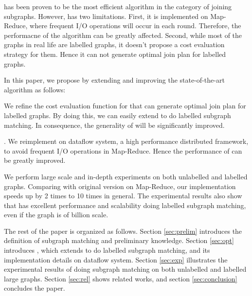  \cliquejoin has been proven to be the most efficient algorithm in the category of joining subgraphs\cite{Lai2016}. However, \cliquejoin has two limitations. First, it is implemented on Map-Reduce, where frequent I/O operations will occur in each round. Therefore, the performacne of the algorithm can be greatly affected. Second, while most of the graphs in real life are labelled graphs, it doesn't propose a cost evaluation strategy for them. Hence it can not generate optimal join plan for labelled graphs.

 In this paper, we propose \gencliqjoin by extending and improving the state-of-the-art algorithm \cliquejoin as follows:

 We refine the cost evaluation function for \cliquejoin that can generate optimal join plan for labelled graphs. By doing this, we can easily extend \cliquejoin to do labelled subgraph matching. In consequence, the generality of \cliquejoin will be significantly improved.

\cite{Murray2013}. We reimplement \cliquejoin on \timely dataflow system, a high performance distributed framework, to avoid frequent I/O operations in Map-Reduce. Hence the performance of \cliquejoin can be greatly improved.

 We perform large scale and in-depth experiments on both unlabelled and labelled graphs. Comparing with original version on Map-Reduce, our implementation speeds up \cliquejoin by 2 times to 10 times in general. The experimental results also show that \gencliqjoin has excellent performance and scalability doing labelled subgraph matching, even if the graph is of billion scale.

 The rest of the paper is organized as follows. Section \ref{sec:prelim} introduces the definition of subgraph matching and preliminary knowledge. Section \ref{sec:opt} introduces \gencliqjoin, which extends \cliquejoin to do labelled subgraph matching, and its implementation details on \timely dataflow system. Section \ref{sec:exp} illustrates the experimental results of doing subgraph matching on both unlabelled and labelled large graphs. Section \ref{sec:rel} shows related works, and section \ref{sec:conclusion} concludes the paper.